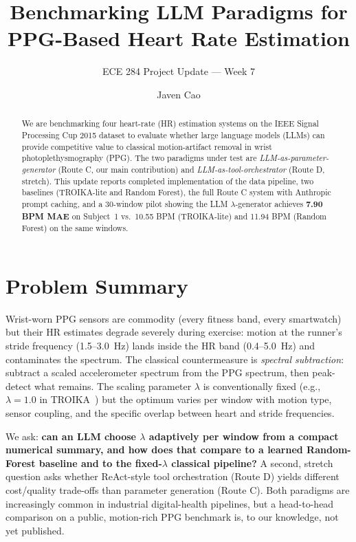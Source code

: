 \documentclass[sigconf,nonacm,balance]{acmart}
\title{Benchmarking LLM Paradigms for PPG-Based Heart Rate Estimation}
\subtitle{ECE 284 Project Update — Week 7}
\author{Javen Cao}
\affiliation{%
  \institution{University of California, San Diego}
  \city{La Jolla}\state{CA}\country{USA}
}
\begin{document}
\begin{abstract}
We are benchmarking four heart-rate (HR) estimation systems on the IEEE Signal Processing Cup 2015 dataset to evaluate whether large language models (LLMs) can provide competitive value to classical motion-artifact removal in wrist photoplethysmography (PPG). The two paradigms under test are \emph{LLM-as-parameter-generator} (Route C, our main contribution) and \emph{LLM-as-tool-orchestrator} (Route D, stretch). This update reports completed implementation of the data pipeline, two baselines (TROIKA-lite and Random Forest), the full Route C system with Anthropic prompt caching, and a 30-window pilot showing the LLM $\lambda$-generator achieves \textbf{7.90 BPM MAE} on Subject~1 vs.\ 10.55 BPM (TROIKA-lite) and 11.94 BPM (Random Forest) on the same windows.
\end{abstract}

\maketitle

\section{Problem Summary}
Wrist-worn PPG sensors are commodity (every fitness band, every smart\-watch) but their HR estimates degrade severely during exercise: motion at the runner's stride frequency (1.5--3.0~Hz) lands inside the HR band (0.4--5.0~Hz) and contaminates the spectrum. The classical countermeasure is \emph{spectral subtraction}: subtract a scaled accelerometer spectrum from the PPG spectrum, then peak-detect what remains. The scaling parameter $\lambda$ is conventionally fixed (e.g., $\lambda{=}1.0$ in TROIKA~\cite{zhang2015troika}) but the optimum varies per window with motion type, sensor coupling, and the specific overlap between heart and stride frequencies.

We ask: \textbf{can an LLM choose $\lambda$ adaptively per window from a compact numerical summary, and how does that compare to a learned Random-Forest baseline and to the fixed-$\lambda$ classical pipeline?} A second, stretch question asks whether ReAct-style tool orchestration (Route D) yields different cost/quality trade-offs than parameter generation (Route C). Both paradigms are increasingly common in industrial digital-health pipelines, but a head-to-head comparison on a public, motion-rich PPG benchmark is, to our knowledge, not yet published.
\end{document}
